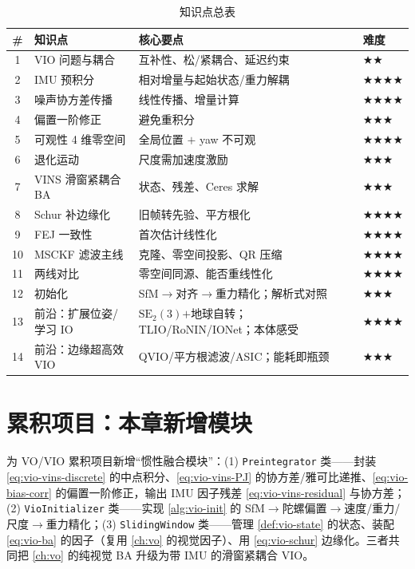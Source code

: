 \begin{table}[H]\centering\small
\caption{知识点总表}
\label{tab:vio-knowledge}
\begin{tabular}{clll}
\toprule
\# & 知识点 & 核心要点 & 难度 \\
\midrule
1 & VIO 问题与耦合 & 互补性、松/紧耦合、延迟约束 & \(\bigstar\bigstar\) \\
2 & IMU 预积分 & 相对增量与起始状态/重力解耦 & \(\bigstar\bigstar\bigstar\bigstar\) \\
3 & 噪声协方差传播 & 线性传播、增量计算 & \(\bigstar\bigstar\bigstar\bigstar\) \\
4 & 偏置一阶修正 & 避免重积分 & \(\bigstar\bigstar\bigstar\) \\
5 & 可观性 4 维零空间 & 全局位置 $+$ yaw 不可观 & \(\bigstar\bigstar\bigstar\bigstar\) \\
6 & 退化运动 & 尺度需加速度激励 & \(\bigstar\bigstar\bigstar\) \\
7 & VINS 滑窗紧耦合 BA & 状态、残差、Ceres 求解 & \(\bigstar\bigstar\bigstar\) \\
8 & Schur 补边缘化 & 旧帧转先验、平方根化 & \(\bigstar\bigstar\bigstar\bigstar\) \\
9 & FEJ 一致性 & 首次估计线性化 & \(\bigstar\bigstar\bigstar\bigstar\) \\
10 & MSCKF 滤波主线 & 克隆、零空间投影、QR 压缩 & \(\bigstar\bigstar\bigstar\bigstar\) \\
11 & 两线对比 & 零空间同源、能否重线性化 & \(\bigstar\bigstar\bigstar\bigstar\) \\
12 & 初始化 & SfM$\to$对齐$\to$重力精化；解析式对照 & \(\bigstar\bigstar\bigstar\) \\
13 & 前沿：扩展位姿/学习 IO & $\mathrm{SE}_2(3)$$+$地球自转；TLIO/RoNIN/IONet；本体感受 & \(\bigstar\bigstar\bigstar\bigstar\) \\
14 & 前沿：边缘超高效 VIO & QVIO/平方根滤波/ASIC；能耗即瓶颈 & \(\bigstar\bigstar\bigstar\) \\
\bottomrule
\end{tabular}
\end{table}

\section*{累积项目：本章新增模块}
为 VO/VIO 累积项目新增“惯性融合模块”：(1) \texttt{Preintegrator} 类——封装 \cref{eq:vio-vins-discrete} 的中点积分、\cref{eq:vio-vins-PJ} 的协方差/雅可比递推、\cref{eq:vio-bias-corr} 的偏置一阶修正，输出 IMU 因子残差 \cref{eq:vio-vins-residual} 与协方差；(2) \texttt{VioInitializer} 类——实现 \cref{alg:vio-init} 的 SfM$\to$陀螺偏置$\to$速度/重力/尺度$\to$重力精化；(3) \texttt{SlidingWindow} 类——管理 \cref{def:vio-state} 的状态、装配 \cref{eq:vio-ba} 的因子（复用 \cref{ch:vo} 的视觉因子）、用 \cref{eq:vio-schur} 边缘化。三者共同把 \cref{ch:vo} 的纯视觉 BA 升级为带 IMU 的滑窗紧耦合 VIO。

